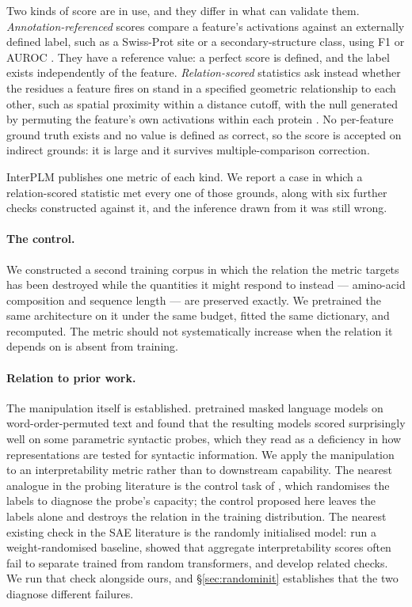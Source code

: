 \documentclass{article} %
\begin{document}
Two kinds of score are in use, and they differ in what can validate them.
\emph{Annotation-referenced} scores compare a feature's activations against an externally
defined label, such as a Swiss-Prot site or a secondary-structure class, using F1 or AUROC
\citep{simon2025interplm,adams2025mechanistic}. They have a reference value: a perfect score is
defined, and the label exists independently of the feature. \emph{Relation-scored} statistics
ask instead whether the residues a feature fires on stand in a specified geometric relationship
to each other, such as spatial proximity within a distance cutoff, with the null generated by
permuting the feature's own activations within each protein \citep{simon2025interplm}. No
per-feature ground truth exists and no value is defined as correct, so the score is accepted on
indirect grounds: it is large and it survives multiple-comparison correction.

InterPLM \citep{simon2025interplm} publishes one metric of each kind. We report a case in which
a relation-scored statistic met every one of those grounds, along with six further checks
constructed against it, and the inference drawn from it was still wrong.

\paragraph{The control.} We constructed a second training corpus in which the relation the
metric targets has been destroyed while the quantities it might respond to instead --- amino-acid
composition and sequence length --- are preserved exactly. We pretrained the same architecture on
it under the same budget, fitted the same dictionary, and recomputed. The metric should not
systematically increase when the relation it depends on is absent from training.

\paragraph{Relation to prior work.} The manipulation itself is established.
\citet{sinha2021masked} pretrained masked language models on word-order-permuted text and found
that the resulting models scored surprisingly well on some parametric syntactic probes, which
they read as a deficiency in how representations are tested for syntactic information. We apply
the manipulation to an interpretability metric rather than to downstream capability. The nearest
analogue in the probing literature is the control task of \citet{hewitt2019designing}, which
randomises the labels to diagnose the probe's capacity; the control proposed here leaves the
labels alone and destroys the relation in the training distribution. The nearest existing check
in the SAE literature is the randomly initialised model: \citet{simon2025interplm} run a
weight-randomised baseline, \citet{heap2025automated} showed that aggregate interpretability
scores often fail to separate trained from random transformers, and \citet{korznikov2026sanity}
develop related checks. We run that check alongside ours, and \S\ref{sec:randominit} establishes
that the two diagnose different failures.
\end{document}
